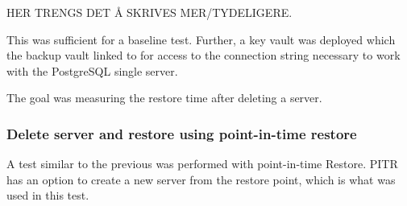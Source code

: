 HER TRENGS DET Å SKRIVES MER/TYDELIGERE.

This was sufficient for a baseline test. Further, a key vault was deployed which the backup vault linked to for access to the connection string necessary to work with the PostgreSQL single server. 

The goal was measuring the restore time after deleting a server. 

\subsubsection{Delete server and restore using point-in-time restore}

A test similar to the previous was performed with point-in-time Restore.
PITR has an option to create a new server from the restore point,
which is what was used in this test.

